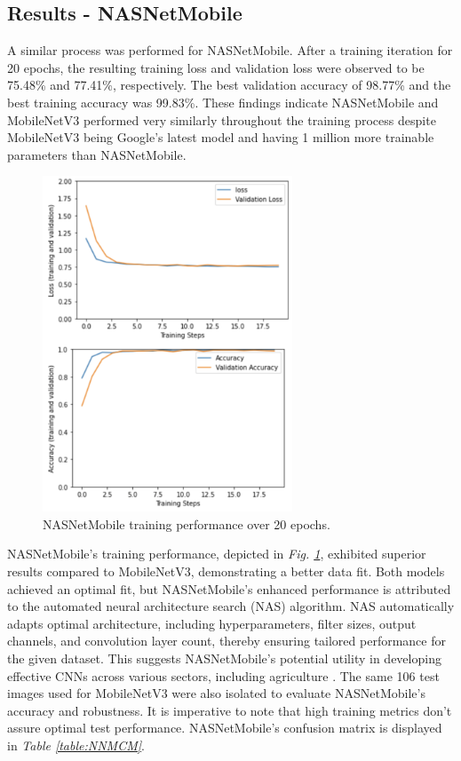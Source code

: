 \documentclass[conference]{IEEEtran}
\begin{document}
\subsection{Results - NASNetMobile}

A similar process was performed for NASNetMobile. After a training iteration for 20 epochs, the resulting training loss and validation loss were observed to be 75.48\% and 77.41\%, respectively. The best validation accuracy of 98.77\% and the best training accuracy was 99.83\%. These findings indicate NASNetMobile and MobileNetV3 performed very similarly throughout the training process despite MobileNetV3 being Google's latest model and having 1 million more trainable parameters than NASNetMobile. 


\begin{figure}[h]
\centerline{\includegraphics[height=10cm, width = .9\linewidth]{Images/Screen Shot 2021-05-10 at 4.36.35 PM.pdf}}
\caption{NASNetMobile training performance over 20 epochs. }
\label{NNMStats}
\end{figure}

NASNetMobile's training performance, depicted in \emph{Fig. \ref{NNMStats}}, exhibited superior results compared to MobileNetV3, demonstrating a better data fit. Both models achieved an optimal fit, but NASNetMobile's enhanced performance is attributed to the automated neural architecture search (NAS) algorithm. NAS automatically adapts optimal architecture, including hyperparameters, filter sizes, output channels, and convolution layer count, thereby ensuring tailored performance for the given dataset. This suggests NASNetMobile's potential utility in developing effective CNNs across various sectors, including agriculture \cite{Yanhui}. The same 106 test images used for MobileNetV3 were also isolated to evaluate NASNetMobile's accuracy and robustness. It is imperative to note that high training metrics don't assure optimal test performance. NASNetMobile's confusion matrix is displayed in \emph{Table \ref{table:NNMCM}}.
\end{document}
